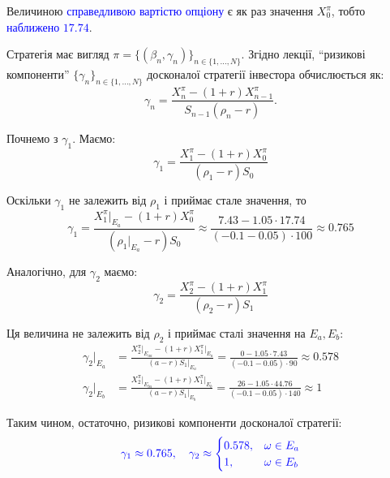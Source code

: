 \documentclass{test_template}
\begin{document}
Величиною \textcolor{blue}{справедливою вартістю опціону} є як раз значення $X_0^{\pi}$, 
тобто \textcolor{blue}{наближено $17.74$}.

Стратегія має вигляд $\pi = \{(\beta_n,\gamma_n)\}_{n \in \{1,\dots,N\}}$. Згідно 
лекції, ``ризикові компоненти'' $\{\gamma_n\}_{n \in \{1,\dots,N\}}$ досконалої 
стратегії інвестора обчислюється як:
\begin{equation*}
    \gamma_n = \frac{X_n^{\pi} - (1+r)X_{n-1}^{\pi}}{S_{n-1}(\rho_n-r)}.
\end{equation*}

Почнемо з $\gamma_1$. Маємо:
\begin{equation*}
    \gamma_1 = \frac{X_1^{\pi} - (1+r)X_0^{\pi}}{(\rho_1-r)S_0}
\end{equation*}

Оскільки $\gamma_1$ не залежить від $\rho_1$ і приймає стале значення, то
\begin{equation*}
    \gamma_1 = \frac{X_1^{\pi}\big|_{E_a} - (1+r)X_0^{\pi}}{\left(\rho_1\big|_{E_a}-r\right)S_0} \approx \frac{7.43 - 1.05 \cdot 17.74}{(-0.1-0.05) \cdot 100} \approx 0.765
\end{equation*}

Аналогічно, для $\gamma_2$ маємо:
\begin{equation*}
    \gamma_2 = \frac{X_2^{\pi} - (1+r)X_1^{\pi}}{(\rho_2-r)S_1}
\end{equation*}

Ця величина не залежить від $\rho_2$ і приймає сталі значення на $E_a,E_b$:
\begin{align*}
    \gamma_2\Big|_{E_a} &= \frac{X_2^{\pi}\big|_{E_{aa}} - (1+r)X_1^{\pi}\big|_{E_a}}{(a-r)S_1\big|_{E_a}} = \frac{0 - 1.05 \cdot 7.43}{(-0.1-0.05) \cdot 90} \approx 0.578 \\
    \gamma_2\Big|_{E_b} &= \frac{X_2^{\pi}\big|_{E_{ba}} - (1+r)X_1^{\pi}\big|_{E_b}}{(a-r)S_1\big|_{E_b}} = \frac{26 - 1.05 \cdot 44.76}{(-0.1-0.05) \cdot 140} \approx 1
\end{align*}

Таким чином, остаточно, ризикові компоненти досконалої стратегії:
\begin{equation*}
    \textcolor{blue}{\gamma_1 \approx 0.765, \quad \gamma_2 \approx \begin{cases}
        0.578, & \omega \in E_a \\
        1, & \omega \in E_b
    \end{cases}}
\end{equation*}
\end{document}
